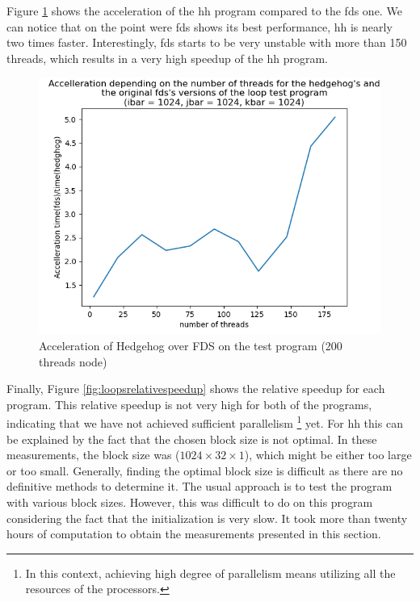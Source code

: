 Figure \ref{fig:loopsspeedup} shows the acceleration of the
\gls{hh} program compared to the \gls{fds} one. We can notice that on the point
were \gls{fds} shows its best performance, \gls{hh} is nearly two times faster.
Interestingly, \gls{fds} starts to be very unstable with more than 150 threads,
which results in a very high speedup of the \gls{hh} program.

\begin{figure}[ht!]
  \begin{center}
    \includegraphics[scale=0.6]{img/fds-loops/speedup.png}
    \caption{Acceleration of Hedgehog over FDS on the test program (200 threads node)}
    \label{fig:loopsspeedup}
  \end{center}
\end{figure}

Finally, Figure \ref{fig:loopsrelativespeedup} shows the relative speedup for
each program. This relative speedup is not very high for both of the programs,
indicating that we have not achieved sufficient parallelism \footnote{In this
context, achieving high degree of parallelism means utilizing all the resources
of the processors.} yet. For \gls{hh} this can be explained by the fact that the
chosen block size is not optimal. In these measurements, the block size was
($1024\times32\times1$), which might be either too large or too small.
Generally, finding the optimal block size is difficult as there are no
definitive methods to determine it. The usual approach is to test the program
with various block sizes. However, this was difficult to do on this program
considering the fact that the initialization is very slow. It took more than
twenty hours of computation to obtain the measurements presented in this
section.

